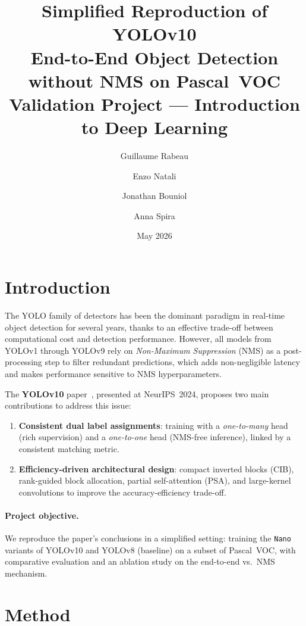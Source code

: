 \documentclass[11pt,a4paper]{article}
\title{
  \textbf{Simplified Reproduction of YOLOv10}\\[4pt]
  \large End-to-End Object Detection without NMS on Pascal~VOC\\[8pt]
  \normalsize Validation Project --- Introduction to Deep Learning
}
\author{
  Guillaume Rabeau \and Enzo Natali \and Jonathan Bouniol \and Anna Spira
}
\date{May 2026}
\begin{document}
\maketitle

\tableofcontents
\newpage

\section{Introduction}

The YOLO family of detectors has been the dominant paradigm in real-time object detection for several years, thanks to an effective trade-off between computational cost and detection performance.
However, all models from YOLOv1 through YOLOv9 rely on \emph{Non-Maximum Suppression} (NMS) as a post-processing step to filter redundant predictions, which adds non-negligible latency and makes performance sensitive to NMS hyperparameters.

The \textbf{YOLOv10} paper~\cite{wang2024yolov10}, presented at NeurIPS~2024, proposes two main contributions to address this issue:
\begin{enumerate}[noitemsep]
  \item \textbf{Consistent dual label assignments}: training with a \emph{one-to-many} head (rich supervision) and a \emph{one-to-one} head (NMS-free inference), linked by a consistent matching metric.
  \item \textbf{Efficiency-driven architectural design}: compact inverted blocks (CIB), rank-guided block allocation, partial self-attention (PSA), and large-kernel convolutions to improve the accuracy-efficiency trade-off.
\end{enumerate}

\paragraph{Project objective.}
We reproduce the paper's conclusions in a simplified setting: training the \texttt{Nano} variants of YOLOv10 and YOLOv8 (baseline) on a subset of Pascal~VOC, with comparative evaluation and an ablation study on the end-to-end vs.\ NMS mechanism.

\section{Method}
\end{document}
